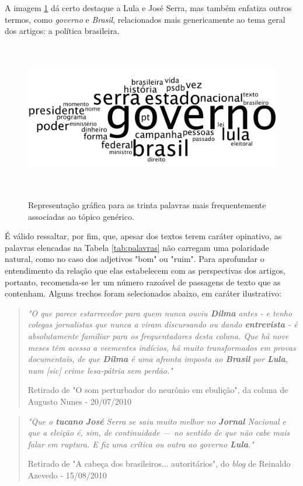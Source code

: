A imagem \ref{generico} dá certo destaque a Lula e José Serra, mas também enfatiza outros termos, como \emph{governo} e \emph{Brasil}, relacionados mais genericamente ao tema geral dos artigos: a política brasileira.

\begin{figure}[h!]
  \centering %
  \includegraphics[width=12.5cm, height=6.5cm]{generico.png}\\
  \caption{Representação gráfica para as trinta palavras mais frequentemente associadas ao tópico genérico.}
  \label{generico}
\end{figure}


É válido ressaltar, por fim, que, apesar dos textos terem caráter opinativo, as palavras elencadas na Tabela \ref{tab:palavras} não carregam uma polaridade natural, como no caso dos adjetivos "bom" ou "ruim". Para aprofundar o entendimento da relação que elas estabelecem com as perspectivas dos artigos, portanto, recomenda-se ler um número razoável de passagens de texto que as contenham. Alguns trechos foram selecionados abaixo, em caráter ilustrativo:

\begin{quote}
\emph{"O que parece estarrecedor para quem nunca ouviu \textbf{Dilma} antes - e tenho colegas jornalistas que nunca a viram discursando ou dando \textbf{entrevista} - é absolutamente familiar para os frequentadores desta coluna. Que há nove meses têm acesso a veementes indícios, há muito transformados em provas documentais, de que \textbf{Dilma} é uma afronta imposta ao \textbf{Brasil} por \textbf{Lula}, num [sic] crime lesa-pátria sem perdão."}

{\small Retirado de "O som perturbador do neurônio em ebulição", da coluna de Augusto Nunes - 20/07/2010}
\end{quote}

\begin{quote}
\emph{"Que o \textbf{tucano} \textbf{José} Serra se saiu muito melhor no \textbf{Jornal} Nacional e que a eleição é, sim, de continuidade — no sentido de que não cabe mais falar em ruptura. E fiz uma crítica ou outra ao governo \textbf{Lula}."}

{\small Retirado de "A cabeça dos brasileiros... autoritários", do \emph{blog} de Reinaldo Azevedo - 15/08/2010}
\end{quote}


